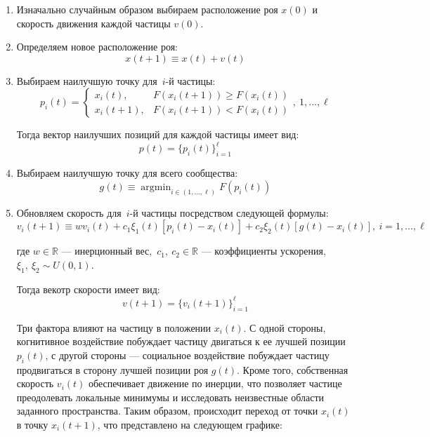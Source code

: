 \begin{enumerate}
	\item Изначально случайным образом выбираем расположение роя $x(0)$ и скорость движения каждой частицы $v(0)$.

	\item Определяем новое расположение роя:
	\[
		x(t + 1) \equiv x(t) + v(t)
	\]

	\item Выбираем наилучшую точку для~$i$-й частицы:
	\begin{equation}
		\label{eq:personal_best}
		p_i(t)
		=
		\begin{cases}
			x_i(t),
			&
			F(x_i(t + 1)) \geq F(x_i(t))
			\\
			x_i(t + 1),
			&
			F(x_i(t + 1)) < F(x_i(t))
		\end{cases}, \ 1, ..., \ell
	\end{equation}

	Тогда вектор наилучших позиций для каждой частицы имеет вид:
	\[
		p(t) = \{p_i(t)\}_{i = 1}^{\ell}
	\]

	\item Выбираем наилучшую точку для всего сообщества:
	\begin{equation}
		\label{eq:social_best}
		g(t)
		\equiv
		\mathop{\mathrm{argmin}}_{i \in (1, ..., \ell)} \limits F(p_i(t))
	\end{equation}

	\item Обновляем скорость для~$i$-й частицы посредством следующей формулы:
	\begin{equation}
		\label{eq:new_velocity}
		v_i(t + 1)
		\equiv
		w
		v_i(t)
		+
		c_1
		\xi_1(t)
		[p_i(t) - x_i(t)]
		+
		c_2
		\xi_2(t)
		[g(t) - x_i(t)], \
		i = 1, ..., \ell
	\end{equation}

	где $w \in \mathbb{R}$ --- инерционный вес,~$c_1,\ c_2 \in \mathbb{R}$ --- коэффициенты ускорения, $\xi_1,\ \xi_2 \sim U(0, 1)$.

	Тогда векотр скорости имеет вид:
	\[
		v(t+1) = \{v_i(t + 1)\}_{i = 1}^{\ell}
	\]

	Три фактора влияют на частицу в положении $x_i(t)$. С одной стороны, когнитивное воздействие побуждает частицу двигаться к ее лучшей позиции $p_i(t)$, с другой стороны --- социальное воздействие побуждает частицу продвигаться в сторону лучшей позиции роя $g(t)$. Кроме того, собственная скорость $v_i(t)$ обеспечивает движение по инерции, что позволяет частице преодолевать локальные минимумы и исследовать неизвестные области заданного пространства. Таким образом, происходит переход от точки $x_i(t)$ в точку $x_i(t+1)$, что представлено на следующем графике:


\end{enumerate}

